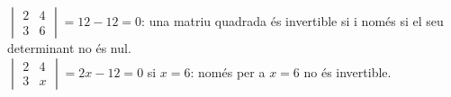 \begin{apartats}
\begin{nomesllarg}
\begin{solucio}
$\begin{vmatrix}2&4\\3&6\end{vmatrix}=12-12=0$: una matriu quadrada és invertible si i només si el seu
determinant no és nul.\\
$\begin{vmatrix}2&4\\3&x\end{vmatrix}=2x-12=0$ si $x=6$: només per a $x=6$ no és invertible.
\end{solucio}
\end{nomesllarg}

\end{apartats}
